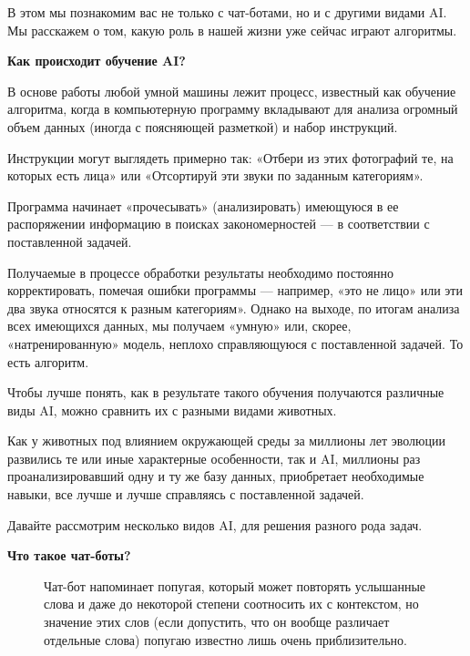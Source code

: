 В этом  мы познакомим вас не только с чат-ботами, но и с другими видами AI. Мы расскажем о том, какую роль в нашей жизни уже сейчас играют алгоритмы.

\textbf{Как происходит обучение AI?}

В основе работы любой умной машины лежит процесс, известный как обучение алгоритма, когда в компьютерную программу вкладывают для анализа огромный объем данных (иногда с поясняющей разметкой) и набор инструкций.

Инструкции могут выглядеть примерно так: «Отбери из этих фотографий те, на которых есть лица» или «Отсортируй эти звуки по заданным категориям».

Программа начинает «прочесывать» (анализировать) имеющуюся в ее распоряжении информацию в поисках закономерностей — в соответствии с поставленной задачей.

Получаемые в процессе обработки результаты необходимо постоянно корректировать, помечая ошибки программы --- например, «это не лицо» или эти два звука относятся к разным категориям». Однако на выходе, по итогам анализа всех имеющихся данных, мы получаем «умную» или, скорее, «натренированную» модель, неплохо справляющуюся с поставленной задачей. То есть алгоритм.

Чтобы лучше понять, как в результате такого обучения получаются различные виды AI, можно сравнить их с разными видами животных.

Как у животных под влиянием окружающей среды за миллионы лет эволюции развились те или иные характерные особенности, так и AI, миллионы раз проанализировавший одну и ту же базу данных, приобретает необходимые навыки, все лучше и лучше справляясь с поставленной задачей.

Давайте рассмотрим несколько видов AI,  для решения разного рода задач.

\clearpage
\textbf{Что такое чат-боты?}

\begin{figure}
    \begin{fancyquotes}
        Чат-бот напоминает попугая, который может повторять услышанные слова и даже до некоторой степени соотносить их с контекстом, но значение этих слов (если допустить, что он вообще различает отдельные слова) попугаю известно лишь очень приблизительно.
    \end{fancyquotes}
\end{figure}

